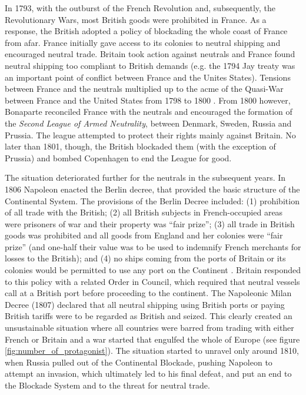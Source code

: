 \documentclass[12pt,a4paper,notitlepage,english]{article}
\begin{document}
\begin{appendix}
In 1793, with the outburst of the French Revolution and, subsequently, the Revolutionary Wars, most British goods were prohibited in France.
As a response, the British adopted a policy of blockading the whole coast of France from afar.
France initially gave access to its colonies to neutral shipping and encouraged neutral trade.
Britain took action against neutrals and France found neutral shipping too compliant to British demands (e.g. the 1794 Jay treaty was an important point of conflict between France and the Unites States).
Tensions between France and the neutrals multiplied up to the acme of the Quasi-War between France and the United States from 1798 to 1800 \cite[pp. 106-118]{Marzagalli2015a}. 
From 1800 however, Bonaparte reconciled France with the neutrals and encouraged the formation of the \textit{Second League of Armed Neutrality}, between Denmark, Sweden, Russia and Prussia.
The league attempted to protect their rights mainly against Britain. 
No later than 1801, though, the British blockaded them (with the exception of Prussia) and bombed Copenhagen to end the League for good.

The situation deteriorated further for the neutrals in the subsequent years.
In 1806 Napoleon enacted the Berlin decree, that provided the basic structure of the Continental System.
The provisions of the Berlin Decree included: (1) prohibition of all trade with the British; (2) all British subjects in French-occupied areas were prisoners of war and their property was ``fair prize''; (3) all trade in British goods was prohibited and all goods from England and her colonies were ``fair prize'' (and one-half their value was to be used to indemnify French merchants for losses to the British); and (4) no ships coming from the ports of Britain or its colonies would be permitted to use any port on the Continent \citep{Davis2006}.
Britain responded to this policy with a related Order in Council, which required that neutral vessels call at a British port before proceeding to the continent.
The Napoleonic Milan Decree (1807) declared that all neutral shipping using British ports or paying British tariffs were to be regarded as British and seized.
This clearly created an unsustainable situation where all countries were barred from trading with either French or Britain and a war started that engulfed the whole of Europe (see figure \ref{fig:number_of_protagonist}).
The situation started to unravel only around 1810, when Russia pulled out of the Continental Blockade, pushing Napoleon to attempt an invasion, which ultimately led to his final defeat, and put an end to the Blockade System and to the threat for neutral trade. 


\end{appendix}
\end{document}
